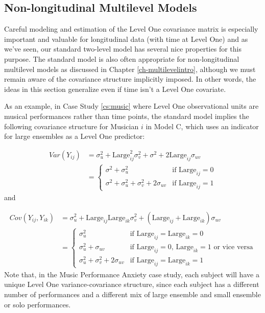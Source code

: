 \documentclass[
]{krantz}
\begin{document}
\subsection{Non-longitudinal Multilevel Models}\label{non-longitudinal-multilevel-models}

Careful modeling and estimation of the Level One covariance matrix is especially important and valuable for longitudinal data (with time at Level One) and as we've seen, our standard two-level model has several nice properties for this purpose. The standard model is also often appropriate for non-longitudinal multilevel models as discussed in Chapter \ref{ch-multilevelintro}, although we must remain aware of the covariance structure implicitly imposed. In other words, the ideas in this section generalize even if time isn't a Level One covariate.

As an example, in Case Study \ref{cs:music} where Level One observational units are musical performances rather than time points, the standard model implies the following covariance structure for Musician \(i\) in Model C, which uses an indicator for large ensembles as a Level One predictor:

\begin{align*}
Var(Y_{ij}) & = \sigma_{u}^{2} + \textrm{Large}^{2}_{ij} \sigma_{v}^{2} + \sigma^{2} + 2\textrm{Large}_{ij}\sigma_{uv} \\
 & = \left\{ \begin{array}{ll}
                 \sigma^{2} + \sigma_{u}^{2} & \mbox{if $\textrm{Large}_{ij}=0$} \\
                 \sigma^{2} + \sigma_{u}^{2} + \sigma_{v}^{2} + 2\sigma_{uv} & \mbox{if $\textrm{Large}_{ij}=1$}
               \end{array}
       \right.
\end{align*}
\noindent and

\begin{align*}
Cov(Y_{ij},Y_{ik}) & = \sigma_{u}^{2} + \textrm{Large}_{ij}\textrm{Large}_{ik} \sigma_{v}^{2} + (\textrm{Large}_{ij} + 
  \textrm{Large}_{ik}) \sigma_{uv} \\
 & = \left\{ \begin{array}{ll}
                 \sigma_{u}^{2} & \mbox{if $\textrm{Large}_{ij}=\textrm{Large}_{ik}=0$} \\
                 \sigma_{u}^{2} + \sigma_{uv} & \mbox{if $\textrm{Large}_{ij}=0$, $\textrm{Large}_{ik}=1$ or vice versa} \\
                 \sigma_{u}^{2} + \sigma_{v}^{2} + 2\sigma_{uv} & \mbox{if $\textrm{Large}_{ij}=\textrm{Large}_{ik}=1$}
               \end{array}
       \right.
\end{align*}
Note that, in the Music Performance Anxiety case study, each subject will have a unique Level One variance-covariance structure, since each subject has a different number of performances and a different mix of large ensemble and small ensemble or solo performances.
\end{document}
